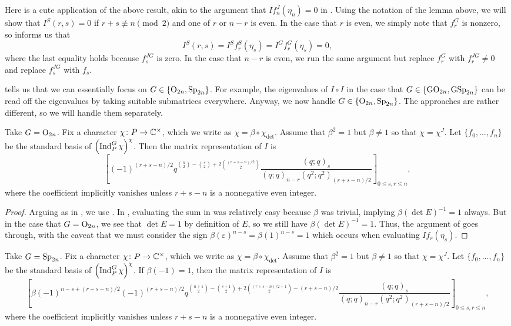 \begin{remark}
	Here is a cute application of the above result, akin to the argument that $If_n^J(\eta_n)=0$ in . Using the notation of the lemma above, we will show that $I^S(r,s)=0$ if $r+s\not\equiv n\pmod 2$ and one of $r$ or $n-r$ is even. In the case that $r$ is even, we simply note that $f_r^G$ is nonzero, so  informs us that
	\[I^S(r,s)=I^Sf_r^S(\eta_s)=I^Gf_r^G(\eta_s)=0,\]
	where the last equality holds because $f_s^{JG}$ is zero. In the case that $n-r$ is even, we run the same argument but replace $f_r^G$ with $f_r^{JG}\ne0$ and replace $f_s^{JG}$ with $f_s$.
\end{remark}
 tells us that we can essentially focus on $G\in\{\mathrm{O}_{2n},\mathrm{Sp}_{2n}\}$. For example, the eigenvalues of $I\circ I$ in the case that $G\in\{\mathrm{GO}_{2n},\mathrm{GSp}_{2n}\}$ can be read off the eigenvalues by taking suitable submatrices everywhere. Anyway, we now handle $G\in\{\mathrm{O}_{2n},\mathrm{Sp}_{2n}\}$. The approaches are rather different, so we will handle them separately.
\begin{proposition}
	Take $G=\mathrm{O}_{2n}$. Fix a character $\chi\colon P\to\mathbb C^\times$, which we write as $\chi=\beta\circ\chi_{\det}$. Assume that $\beta^2=1$ but $\beta\ne1$ so that $\chi=\chi^J$. Let $\{f_0,\ldots,f_n\}$ be the standard basis of $\left(\operatorname{Ind}_P^G\chi\right)^\chi$. Then the matrix representation of $I$ is
	\[\left[(-1)^{(r+s-n)/2}q^{\binom{n}2-\binom{s}2+2\binom{(r+s-n)/2}2}\frac{(q;q)_s}{(q;q)_{n-r}(q^2;q^2)_{(r+s-n)/2}}\right]_{0\le s,r\le n},\]
	where the coefficient implicitly vanishes unless $r+s-n$ is a nonnegative even integer.
\end{proposition}
\begin{proof}
	Arguing as in , we use . In , evaluating the sum in  was relatively easy because $\beta$ was trivial, implying $\beta(\det E)^{-1}=1$ always. But in the case that $G=\mathrm{O}_{2n}$, we see that $\det E=1$ by definition of $E$, so we still have $\beta(\det E)^{-1}=1$. Thus, the argument of  goes through, with the caveat that we must consider the sign $\beta(\varepsilon)^{n-s}=\beta(1)^{n-s}=1$ which occurs when evaluating $If_r(\eta_s)$.
\end{proof}
\begin{proposition} \label{prop:sp-quadratic-matrix}
	Take $G=\mathrm{Sp}_{2n}$. Fix a character $\chi\colon P\to\mathbb C^\times$, which we write as $\chi=\beta\circ\chi_{\det}$. Assume that $\beta^2=1$ but $\beta\ne1$ so that $\chi=\chi^J$. Let $\{f_0,\ldots,f_n\}$ be the standard basis of $\left(\operatorname{Ind}_P^G\chi\right)^\chi$. If $\beta(-1)=1$, then the matrix representation of $I$ is
	\[\left[\beta(-1)^{n-s+(r+s-n)/2}(-1)^{(r+s-n)/2}q^{\binom{n+1}2-\binom{s+1}2+2\binom{(r+s-n)/2+1}2-(r+s-n)/2}\frac{(q;q)_s}{(q;q)_{n-r}(q^2;q^2)_{(r+s-n)/2}}\right]_{0\le s,r\le n},\]
	where the coefficient implicitly vanishes unless $r+s-n$ is a nonnegative even integer.
\end{proposition}
